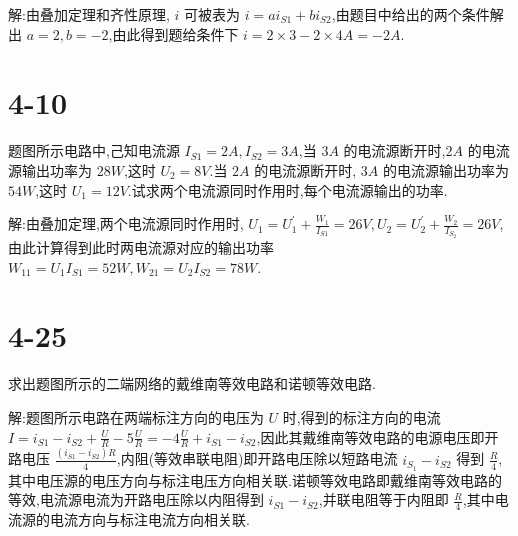         解:由叠加定理和齐性原理, $i$ 可被表为 $i=ai_{S 1}+bi_{S 2}$,由题目中给出的两个条件解出 $a=2,b=-2$,由此得到题给条件下 $i=2\times 3-2\times 4 A=-2A$.
        \section{4-10} 题图所示电路中,己知电流源 $I_{S 1}=2A,I_{S 2}=3A$,当 $3A$ 的电流源断开时,$2A$ 的电流源输出功率为 $28W$,这时 $U_2=8V$.当 $2A$ 的电流源断开时, $3A$ 的电流源输出功率为 $54W$,这时 $U_1=12V$.试求两个电流源同时作用时,每个电流源输出的功率.
        \begin{figure}[ht]
            \centering
            \label{figure:03}
        \end{figure}
        
        解:由叠加定理,两个电流源同时作用时, $U_1=U_1^{'}+\frac{W_1}{I_{S 1}}=26V,U_2=U_2^{'}+\frac{W_2}{I_{S_2}}=26V$,由此计算得到此时两电流源对应的输出功率 $W_{11}=U_1I_{S 1}=52W,W_{21}=U_2I_{S 2}=78W$.

        \section{4-25} 求出题图所示的二端网络的戴维南等效电路和诺顿等效电路.
        \begin{figure}[ht]
            \centering
            \label{figure:04}
        \end{figure}

        解:题图所示电路在两端标注方向的电压为 $U$ 时,得到的标注方向的电流 $I=i_{S 1}-i_{S 2}+\frac{U}{R}-5\frac{U}{R}=-4 \frac{U}{R}+i_{S 1}-i_{S 2}$,因此其戴维南等效电路的电源电压即开路电压 $\frac{(i_{S 1}-i_{S 2})R}{4}$,内阻(等效串联电阻)即开路电压除以短路电流 $i_{S_1}-i_{S 2}$ 得到 $\frac{R}{4}$,其中电压源的电压方向与标注电压方向相关联.诺顿等效电路即戴维南等效电路的等效,电流源电流为开路电压除以内阻得到 $i_{S 1}-i_{S 2}$,并联电阻等于内阻即 $\frac{R}{4}$,其中电流源的电流方向与标注电流方向相关联.

